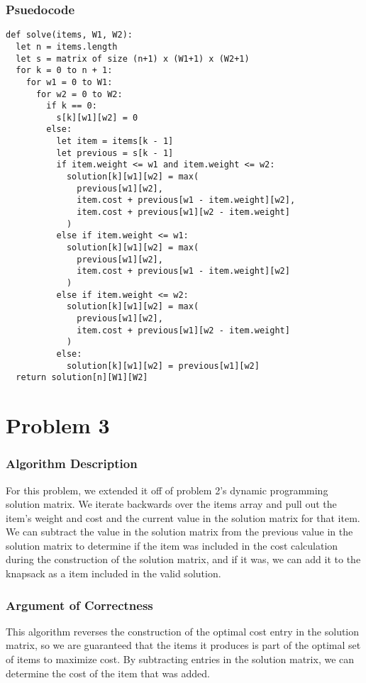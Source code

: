 \documentclass{math}
\begin{document}
\subsubsection*{Psuedocode}
\begin{lstlisting}
def solve(items, W1, W2):
  let n = items.length
  let s = matrix of size (n+1) x (W1+1) x (W2+1)
  for k = 0 to n + 1:
    for w1 = 0 to W1:
      for w2 = 0 to W2:
        if k == 0:
          s[k][w1][w2] = 0
        else:
          let item = items[k - 1]
          let previous = s[k - 1]
          if item.weight <= w1 and item.weight <= w2:
            solution[k][w1][w2] = max(
              previous[w1][w2],
              item.cost + previous[w1 - item.weight][w2],
              item.cost + previous[w1][w2 - item.weight]
            )
          else if item.weight <= w1:
            solution[k][w1][w2] = max(
              previous[w1][w2],
              item.cost + previous[w1 - item.weight][w2]
            )
          else if item.weight <= w2:
            solution[k][w1][w2] = max(
              previous[w1][w2],
              item.cost + previous[w1][w2 - item.weight]
            )
          else:
            solution[k][w1][w2] = previous[w1][w2]
  return solution[n][W1][W2]
\end{lstlisting}

\section*{Problem 3}

\subsubsection*{Algorithm Description}
For this problem, we extended it off of problem 2's dynamic programming solution
matrix. We iterate backwards over the items array and pull out the item's
weight and cost and the current value in the solution matrix for that item. We
can subtract the value in the solution matrix from the previous value in the
solution matrix to determine if the item was included in the cost calculation
during the construction of the solution matrix, and if it was, we can add it to
the knapsack as a item included in the valid solution.

\subsubsection*{Argument of Correctness}
This algorithm reverses the construction of the optimal cost entry in the
solution matrix, so we are guaranteed that the items it produces is part of the
optimal set of items to maximize cost. By subtracting entries in the solution
matrix, we can determine the cost of the item that was added.
\end{document}
